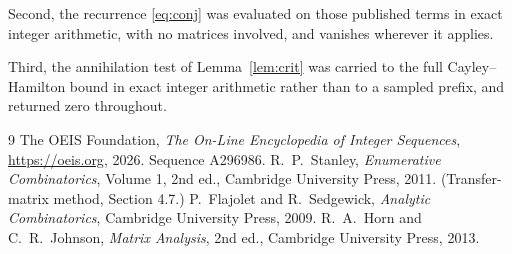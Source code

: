 \documentclass[11pt,a4paper]{article}
\theoremstyle{plain}
\theoremstyle{definition}
\begin{document}
Second, the recurrence \eqref{eq:conj} was evaluated on those published terms in exact
integer arithmetic, with no matrices involved, and vanishes wherever it applies.

Third, the annihilation test of Lemma~\ref{lem:crit} was carried to the full
Cayley--Hamilton bound in exact integer arithmetic rather than to a sampled prefix, and
returned zero throughout.

\begin{thebibliography}{9}
 The OEIS Foundation, \emph{The On-Line Encyclopedia of Integer
Sequences}, \url{https://oeis.org}, 2026. Sequence A296986.
 R.~P.~Stanley, \emph{Enumerative Combinatorics}, Volume 1, 2nd ed.,
Cambridge University Press, 2011. (Transfer-matrix method, Section 4.7.)
 P.~Flajolet and R.~Sedgewick, \emph{Analytic Combinatorics}, Cambridge
University Press, 2009.
 R.~A.~Horn and C.~R.~Johnson, \emph{Matrix Analysis}, 2nd ed., Cambridge
University Press, 2013.
\end{thebibliography}
\end{document}
